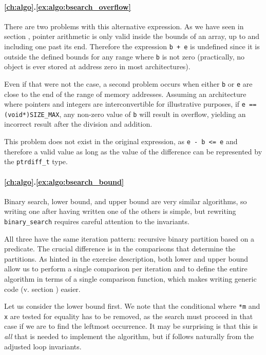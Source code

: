 \paragraph{\ref{ch:algo}.\ref{ex:algo:bsearch_overflow}}

There are two problems with this alternative expression.  As we have seen in
section , pointer arithmetic is only valid inside the bounds of
an array, up to and including one past its end.  Therefore the expression
\texttt{b + e} is undefined since it is outside the defined bounds for any range
where \texttt{b} is not zero (practically, no object is ever stored at address
zero in most architectures).

Even if that were not the case, a second problem occurs when either \texttt{b}
or \texttt{e} are close to the end of the range of memory addresses.  Assuming
an architecture where pointers and integers are interconvertible for
illustrative purposes, if \texttt{e == (void*)SIZE\_MAX}, any non-zero value of
\texttt{b} will result in overflow, yielding an incorrect result after the
division and addition.

This problem does not exist in the original expression, as \texttt{e - b <= e}
and therefore a valid value as long as the value of the difference can be
represented by the \texttt{ptrdiff\_t} type.

\paragraph{\ref{ch:algo}.\ref{ex:algo:bsearch_bound}}

Binary search, lower bound, and upper bound are very similar algorithms, so
writing one after having written one of the others is simple, but rewriting
\texttt{binary\_search} requires careful attention to the invariants.

All three have the same iteration pattern: recursive binary partition based on a
predicate.  The crucial difference is in the comparisons that determine the
partitions.  As hinted in the exercise description, both lower and upper bound
allow us to perform a single comparison per iteration and to define the entire
algorithm in terms of a single comparison function, which makes writing generic
code (v. section ) easier.

Let us consider the lower bound first.  We note that the conditional where
\texttt{*m} and \texttt{x} are tested for equality has to be removed, as the
search must proceed in that case if we are to find the leftmost occurrence.  It
may be surprising is that this is \emph{all} that is needed to implement the
algorithm, but if follows naturally from the adjusted loop invariants.

